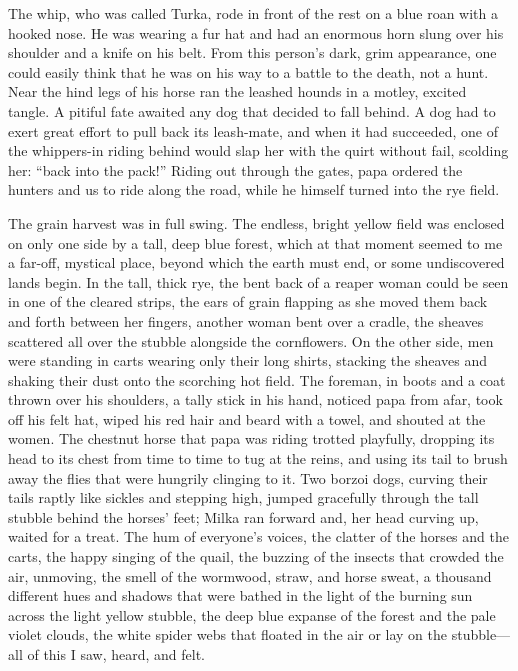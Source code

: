 The whip, who was called Turka, rode in front of the rest on a blue roan with a hooked nose. He was wearing a fur hat and had an enormous horn slung over his shoulder and a knife on his belt. From this person's dark, grim appearance, one could easily think that he was on his way to a battle to the death, not a hunt. Near the hind legs of his horse ran the leashed hounds in a motley, excited tangle. A pitiful fate awaited any dog that decided to fall behind. A dog had to exert great effort to pull back its leash-mate, and when it had succeeded, one of the whippers-in riding behind would slap her with the quirt without fail, scolding her: ``back into the pack!'' Riding out through the gates, papa ordered the hunters and us to ride along the road, while he himself turned into the rye field.

The grain harvest was in full swing. The endless, bright yellow field was enclosed on only one side by a tall, deep blue forest, which at that moment seemed to me a far-off, mystical place, beyond which the earth must end, or some undiscovered lands begin. In the tall, thick rye, the bent back of a reaper woman could be seen in one of the cleared strips, the ears of grain flapping as she moved them back and forth between her fingers, another woman bent over a cradle, the sheaves scattered all over the stubble alongside the cornflowers. On the other side, men were standing in carts wearing only their long shirts, stacking the sheaves and shaking their dust onto the scorching hot field. The foreman, in boots and a coat thrown over his shoulders, a tally stick in his hand, noticed papa from afar, took off his felt hat, wiped his red hair and beard with a towel, and shouted at the women. The chestnut horse that papa was riding trotted playfully, dropping its head to its chest from time to time to tug at the reins, and using its tail to brush away the flies that were hungrily clinging to it. Two borzoi dogs, curving their tails raptly like sickles and stepping high, jumped gracefully through the tall stubble behind the horses' feet; Milka ran forward and, her head curving up, waited for a treat. The hum of everyone's voices, the clatter of the horses and the carts, the happy singing of the quail, the buzzing of the insects that crowded the air, unmoving, the smell of the wormwood,  straw, and horse sweat, a thousand different hues and shadows that were bathed in the light of the burning sun across the light yellow stubble, the deep blue expanse of the forest and the pale violet clouds, the white spider webs that floated in the air or lay on the stubble---all of this I saw, heard, and felt.

